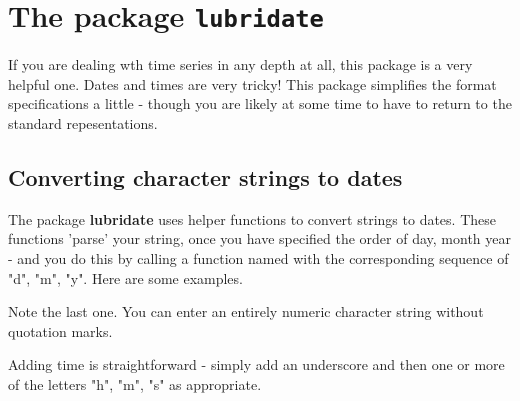 \documentclass[titlepage]{book}\usepackage{knitr}
\begin{document}
\section{The package \texttt{lubridate}}

If you are dealing wth time series in any depth at all, this package is a very helpful one. Dates and times are very tricky!
This package simplifies the format specifications a little -  though you are likely at some time to have to return to the standard repesentations.

\subsection{Converting character strings to dates}

The package \textbf{lubridate} uses helper functions to convert strings to dates. These functions 'parse' your string, once you have specified the order of day, month year - and you do this by calling a function named with the corresponding sequence of "d", "m", "y". Here are some examples.

\begin{knitrout}
\color{fgcolor}\begin{kframe}
\begin{alltt}
\hlstd{(}\hlstd{)}                               
\hlstd{(}\hlstd{)}
\hlstd{(}\hlstd{)}
\hlstd{(}\hlstd{)}
\hlstd{(}\hlstd{)}
 \hlkwb{<-} \hlstd{(}\hlstd{)}
\hlstd{(}\hlstd{)}
\hlstd{(}\hlstd{)}
\hlstd{(}\hlstd{)}
\hlstd{(}\hlstd{)}
\hlstd{(}\hlstd{)}
\end{alltt}
\end{kframe}
\end{knitrout}
Note the last one.  You can enter an entirely numeric character string without quotation marks.

Adding time is straightforward - simply add an underscore and then one or more of the letters "h", "m", "s" as appropriate.
\end{document}
